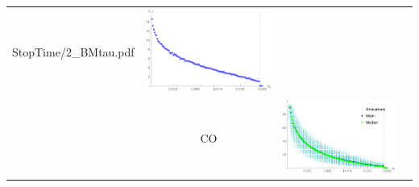 \begin{table}[!htb]
\begin{tabular}{c|c|c|c}
\begin{minipage}{.4\textwidth}
			{StopTime/2_BMtau.pdf}
		\end{minipage}
		& \begin{minipage}{.4\textwidth}
			\includegraphics[width=\linewidth]
			{StopTime/2_BMsd.pdf}
		\end{minipage} 
	 \\ \cline{2-4} 
		& CO &
			\begin{minipage}{.4\textwidth}
			\includegraphics[width=\linewidth]
			{StopTime/2_COMtau.pdf}
		\end{minipage}
		& \begin{minipage}{.4\textwidth}
			\includegraphics[width=\linewidth]

\end{minipage}
\end{tabular}
\end{table}
